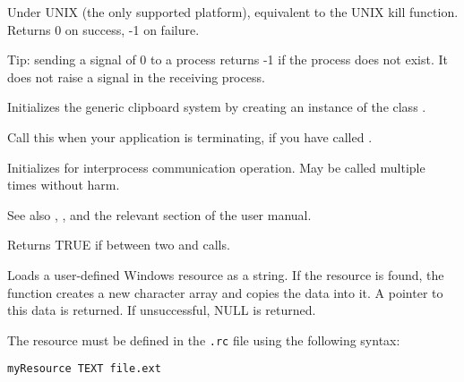 Under UNIX (the only supported platform), equivalent to the UNIX kill function.
Returns 0 on success, -1 on failure.

Tip: sending a signal of 0 to a process returns -1 if the process does not exist.
It does not raise a signal in the receiving process.

\label{wxinitclipboard}


Initializes the generic clipboard system by creating an instance of
the class .

\label{wxipccleanup}


Call this when your application is terminating, if you have
called .

\label{wxipcinitialize}


Initializes for interprocess communication operation. May
be called multiple times without harm.

See also , , 
and the relevant section of the user manual.

\label{wxisbusy}


Returns TRUE if between two  and\rtfsp
{} calls.

\label{wxloaduserresource}


Loads a user-defined Windows resource as a string. If the resource is found, the function creates
a new character array and copies the data into it. A pointer to this data is returned. If unsuccessful, NULL is returned.

The resource must be defined in the {\tt .rc} file using the following syntax:

\begin{verbatim}
myResource TEXT file.ext
\end{verbatim}

